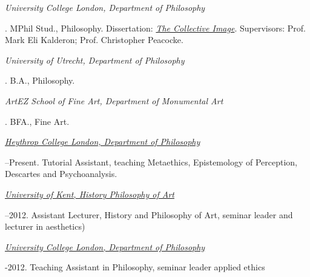 \documentclass[11pt]{article}
\begin{document}
\noindent\emph{University College London, Department of  Philosophy \vspace{0.01in}}


. MPhil Stud., Philosophy. Dissertation: \href{http://discovery.ucl.ac.uk/1348204/}{\emph{The Collective Image}}. Supervisors: Prof. Mark Eli Kalderon; Prof. Christopher Peacocke. \vspace{-0.1in}

\bigskip

\noindent\emph{University of Utrecht, Department of  Philosophy\vspace{0.02in}}

. B.A., Philosophy.

\medskip

\noindent\emph{ArtEZ School of Fine Art, Department of Monumental Art\vspace{0.02in}}

. BFA., Fine Art.

\bigskip

\bigskip


\noindent\href{http://www.heythrop.ac.uk/departments/academic-departments/philosophy/}{\emph{Heythrop College London, Department of  Philosophy} \vspace{0.01in}}

--Present. Tutorial Assistant, teaching Metaethics, Epistemology of Perception, Descartes and Psychoanalysis.

\medskip

\noindent\href{http://www.kent.ac.uk/arts/hpa/index.html}{\emph{University of Kent, History \amper Philosophy of Art} \vspace{0.01in}}

--2012. Assistant Lecturer, History and Philosophy of Art, seminar leader and lecturer in aesthetics)

\medskip

\noindent\href{http://www.ucl.ac.uk/philosophy/}{\emph{University College London, Department of  Philosophy}} \vspace{0.01in}

-2012. Teaching Assistant in Philosophy, seminar leader applied ethics

% 
% 
% 
% 
% 
\end{document}
